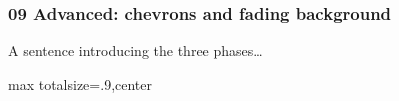 
\begin{frame}
    \frametitle{09 Advanced: chevrons and fading background}

    \pgfmathsetmacro{}
    \pgfmathsetmacro{}
    \pgfmathsetmacro{}
    \pgfmathsetmacro{}
    \pgfmathsetmacro{}

    \begin{center}
        A sentence introducing the \alert{three phases}\ldots
    \end{center}

    \vspace{1em}

    \begin{adjustbox}{max totalsize={.9\textwidth}{\textheight},center}
        
    \end{adjustbox}
\end{frame}
